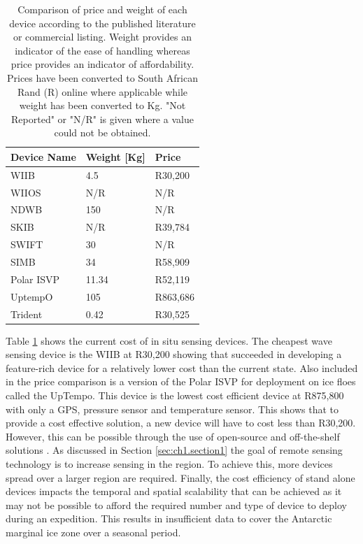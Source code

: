 \begin{table}[H]
	\centering
	\caption{Comparison of price and weight of each device according to the published literature or commercial listing. Weight provides an indicator of the ease of handling whereas price provides an indicator of affordability. Prices have been converted to South African Rand (R)  online \cite{usdcoversion}where applicable while weight has been converted to Kg. "Not Reported"  or "N/R" is given where a value could not be obtained.}
	\label{tab:device_price}
	\setlength{\extrarowheight}{5pt}
	\small
	\begin{tabular}{lll}
		\hline
		\textbf{Device Name} & \textbf{Weight [Kg]} & \textbf{Price} \\
		\hline
		\hline
		WIIB & 4.5 & R30,200\footnotemark[2]\\
		\hline
		WIIOS & N/R & N/R \\
		\hline
		NDWB & 150 & N/R \\
		\hline
		SKIB  & N/R &  R39,784\\
		\hline
		SWIFT & 30 & N/R \\
		\hline
		SIMB & 34 & R58,909 \\
		\hline
		Polar ISVP & 11.34 & R52,119\\
		\hline
		UptempO & 105 & R863,686\\
		\hline
		Trident & 0.42 & R30,525\footnotemark[3] \\
		\hline
		\hline
	\end{tabular}
\end{table}
Table \ref{tab:device_price} shows the current cost of in situ sensing devices. The cheapest wave sensing device is the WIIB at R30,200 showing that \textcite{rabault2019open} succeeded in developing a feature-rich device for a relatively lower cost than the current state. Also included in the price comparison is a version of the Polar ISVP for deployment on ice floes called the UpTempo. This device is the lowest cost efficient device at R875,800 with only a GPS, pressure sensor and temperature sensor. This shows that to provide a cost effective solution, a new device will have to cost less than R30,200. However, this can be possible through the use of open-source and off-the-shelf solutions \cite{bonvoisin2017source}. As discussed in Section \ref{sec:ch1.section1} the goal of remote sensing technology is to increase sensing in the region. To achieve this, more devices spread over a larger region are required. Finally, the cost efficiency of stand alone devices impacts the temporal and spatial scalability that can be achieved as it may not be possible to afford the required number and type of device to deploy during an expedition. This results in insufficient data to cover the Antarctic marginal ice zone over a seasonal period. \par

